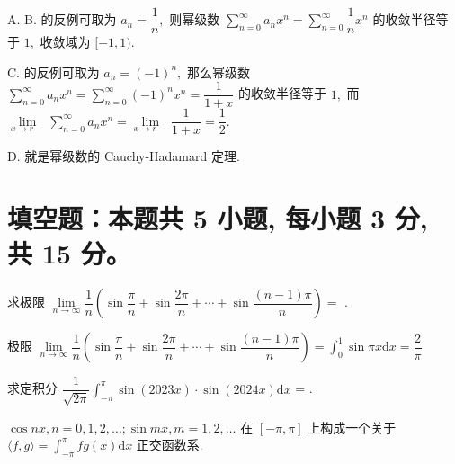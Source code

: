 \begin{solution}
  A. B. 的反例可取为 $a_n = \dfrac{1}{n},$ 则幂级数 $\sum\limits_{n=0}^\infty a_n x^n = \sum\limits_{n=0}^\infty \dfrac{1}{n} x^n$ 的收敛半径等于 $1,$ 收敛域为 $[-1, 1).$

  C. 的反例可取为 $a_n = (-1)^n,$ 那么幂级数 $\sum\limits_{n=0}^\infty a_n x^n = \sum\limits_{n=0}^\infty (-1)^n x^n = \dfrac{1}{1+x}$ 的收敛半径等于 $1,$ 而 $\lim\limits_{x \to r-} \sum\limits_{n=0}^\infty a_n x^n = \lim\limits_{x \to r-} \dfrac{1}{1+x} = \dfrac{1}{2}.$

  D. 就是幂级数的 Cauchy-Hadamard 定理.
\end{solution}


\section{填空题：本题共 5 小题, 每小题 3 分, 共 15 分。}



\begin{question}
  求极限 $\lim\limits_{n\to\infty} \dfrac{1}{n} \left( \sin\dfrac{\pi}{n} + \sin\dfrac{2\pi}{n} + \cdots + \sin\dfrac{(n-1)\pi}{n} \right) = $ \fillin[$\dfrac{2}{\pi}$].
\end{question}

\begin{solution}
  极限 $\lim\limits_{n\to\infty} \dfrac{1}{n} \left( \sin\dfrac{\pi}{n} + \sin\dfrac{2\pi}{n} + \cdots + \sin\dfrac{(n-1)\pi}{n} \right) = \int_0^1 \sin \pi x \mathrm{d} x = \dfrac{2}{\pi}$
\end{solution}

\begin{question}
  求定积分 $\dfrac{1}{\sqrt{2\pi}}\int_{-\pi}^{\pi} \sin (2023 x) \cdot \sin (2024 x) \mathrm{d} x$ = \fillin[0].
\end{question}

\begin{solution}
  $\cos nx, n = 0, 1, 2, \dots; \sin m x, m = 1, 2, \dots$ 在 $[-\pi, \pi]$ 上构成一个关于 $\langle f, g \rangle = \int_{-\pi}^{\pi} fg (x) \mathrm{d} x$ 正交函数系.
\end{solution}


